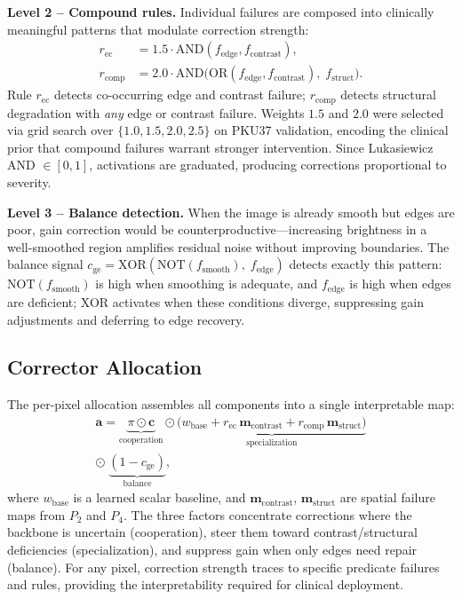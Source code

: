 \documentclass[journal,twoside,web]{ieeecolor}
\begin{document}
\textbf{Level 2 -- Compound rules.} Individual failures are composed into clinically meaningful patterns that modulate correction strength:
\begin{align}
r_\text{ec} &= 1.5 \cdot \text{AND}(f_\text{edge}, f_\text{contrast}), \label{eq:compound1} \\
r_\text{comp} &= 2.0 \cdot \text{AND}\!\big(\text{OR}(f_\text{edge}, f_\text{contrast}),\; f_\text{struct}\big). \label{eq:compound2}
\end{align}
Rule $r_\text{ec}$ detects co-occurring edge and contrast failure; $r_\text{comp}$ detects structural degradation with \emph{any} edge or contrast failure. Weights $1.5$ and $2.0$ were selected via grid search over $\{1.0, 1.5, 2.0, 2.5\}$ on PKU37 validation, encoding the clinical prior that compound failures warrant stronger intervention. Since Lukasiewicz AND $\in [0, 1]$, activations are graduated, producing corrections proportional to severity.

\textbf{Level 3 -- Balance detection.} When the image is already smooth but edges are poor, gain correction would be counterproductive---increasing brightness in a well-smoothed region amplifies residual noise without improving boundaries. The balance signal $c_\text{ge} = \text{XOR}(\text{NOT}(f_\text{smooth}),\; f_\text{edge})$ detects exactly this pattern: $\text{NOT}(f_\text{smooth})$ is high when smoothing is adequate, and $f_\text{edge}$ is high when edges are deficient; XOR activates when these conditions diverge, suppressing gain adjustments and deferring to edge recovery.

\subsection{Corrector Allocation}
The per-pixel allocation assembles all components into a single interpretable map:
\begin{multline}
\mathbf{a} = \underbrace{\pi \odot \mathbf{c}}_{\text{cooperation}} \odot \underbrace{\big(w_\text{base} + r_\text{ec}\,\mathbf{m}_\text{contrast}
 + r_\text{comp}\,\mathbf{m}_\text{struct}\big)}_{\text{specialization}} \\
 \odot\; \underbrace{(1 - c_\text{ge})}_{\text{balance}},
\label{eq:allocation}
\end{multline}
where $w_\text{base}$ is a learned scalar baseline, and $\mathbf{m}_\text{contrast}$, $\mathbf{m}_\text{struct}$ are spatial failure maps from $P_2$ and $P_4$. The three factors concentrate corrections where the backbone is uncertain (cooperation), steer them toward contrast/structural deficiencies (specialization), and suppress gain when only edges need repair (balance). For any pixel, correction strength traces to specific predicate failures and rules, providing the interpretability required for clinical deployment.
\end{document}

